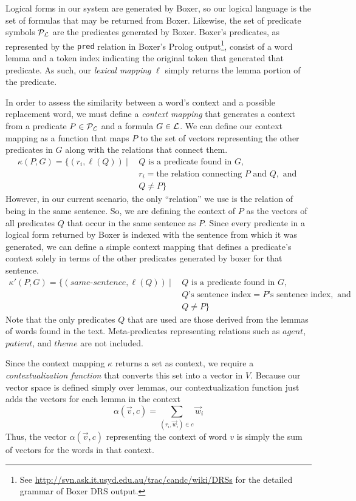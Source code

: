 Logical forms in our system are generated by Boxer, so our logical language
\loglang is the set of formulas that may be returned from Boxer.  Likewise, the
set of predicate symbols ${\cal{P}}_{{\cal{L}}}$ are the predicates generated by
Boxer. Boxer's predicates, as represented by the {\tt pred} relation in Boxer's
Prolog output\footnote{See
\url{http://svn.ask.it.usyd.edu.au/trac/candc/wiki/DRSs} for the detailed
grammar of Boxer DRS output.}, consist of a word lemma and a token index
indicating the original token that generated that predicate.  As such, our 
\emph{lexical mapping} $\ell$ simply returns the lemma portion of the predicate.

In order to assess the similarity between a word's context and a possible
replacement word, we must define a \textit{context mapping} that generates a
context from a predicate $P \in {\cal{P}}_{{\cal{L}}}$ and a formula $G \in
{\cal{L}}$.  
We can define our context mapping as a function that maps $P$ to the set of
vectors representing the other predicates in $G$ along with the relations that
connect them.
\begin{align*}
\kappa(P,G) = \{ (r_i, \ell(Q)) ~|~ 
&~Q \text{ is a predicate found in } G, \\
&~r_i = \text{the relation connecting } P \text{ and } Q, \text{ and } \\
&~Q \neq P \}
\end{align*}
However, in our current scenario, the only ``relation'' we use is the relation
of being in the same sentence.  So, we are defining the context of $P$ as the
vectors of all predicates $Q$ that occur in the same sentence as $P$.
Since every predicate in a logical form returned by Boxer is indexed
with the sentence from which it was generated, we can define a simple context
mapping that defines a predicate's context solely in terms of the other
predicates generated by boxer for that sentence.
\begin{align*}
\kappa'(P,G) = \{ (same\text{-}sentence, \ell(Q)) ~|~ 
&~Q \text{ is a predicate found in } G, \\
&~Q\text{'s sentence index} = P\text{'s sentence index}, \text{ and } \\
&~Q \neq P \}
\end{align*}
Note that the only predicates $Q$ that are used are those derived from the
lemmas of words found in the text.  Meta-predicates representing relations such
as $agent$, $patient$, and $theme$ are not included.

Since the context mapping $\kappa$ returns a set as context, we require a
\textit{contextualization function} that converts this set into a vector in $V$.
Because our vector space is defined simply over lemmas, our contextualization
function just adds the vectors for each lemma in the context \[ \alpha(\vec v,
c) = \sum_{(r_i, \vec w_i) \in c} \vec w_i \]  Thus, the vector $\alpha(\vec v,
c)$ representing the context of word $v$ is simply the sum of vectors for the
words in that context.

